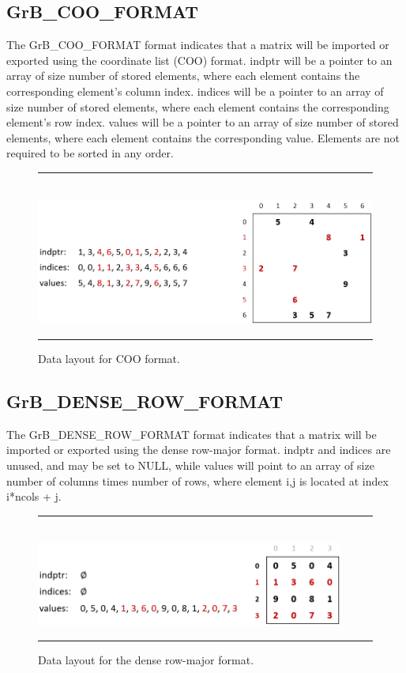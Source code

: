 \subsection{{\sf GrB\_COO\_FORMAT}}

The {\sf GrB\_COO\_FORMAT} format
indicates that a matrix will be imported or exported using the coordinate list
(COO) format.  {\sf indptr} will be a pointer to an array of size number of stored elements,
where each element contains the corresponding element's column index.
{\sf indices} will be a pointer to an array of size number of stored elements, where each
element contains the corresponding element's row index.
{\sf values} will be a pointer to an array of size number of
stored elements, where each element contains the corresponding value. Elements
are not required to be sorted in any order.\\

\begin{figure}[h]
    \hrule
    \begin{center}
        ~\\
        \includegraphics[width=4.5in]{GrB_COO_FORMAT.png}
    \end{center}
    \vspace{-1em}
    \caption{Data layout for COO format.}
    \hrule
\end{figure}

\subsection{{\sf GrB\_DENSE\_ROW\_FORMAT}}

The {\sf GrB\_DENSE\_ROW\_FORMAT} format indicates that a matrix will be imported
or exported using the dense row-major format.  {\sf indptr} and {\sf indices} are unused,
and may be set to NULL, while {\sf values} will point to an array of size number of columns
times number of rows, where element i,j is located at index i*ncols + j.\\

\begin{figure}[h]
    \hrule
    \begin{center}
        ~\\
        \includegraphics[width=4in]{GrB_DENSE_ROW_FORMAT.png}
    \end{center}
    \vspace{-1em}
    \caption{Data layout for the dense row-major format.}
    \hrule
\end{figure}


